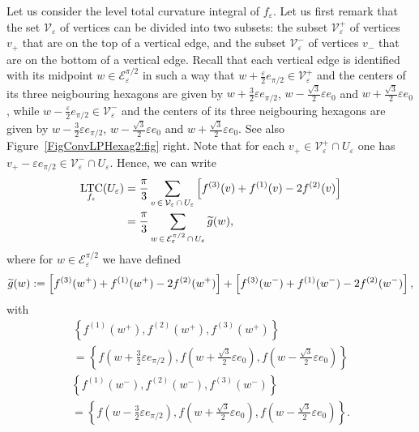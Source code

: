 \documentclass[10pt]{amsart}
\theoremstyle{definition}\newtheorem{defi}[theo]{Definition}\newtheorem{rema}[theo]{Remark}\newtheorem{exam}[theo]{Example}\newtheorem{exem}[theo]{Example}\newtheorem{nota}[theo]{Notation}
\newcommand{\eps}{\varepsilon}
\DeclareMathOperator{\LTC}{LTC}
\newcommand{\calV}{\mathcal{V}}
\newcommand{\calE}{\mathcal{E}}
\let\oldtilde\tilde
\renewcommand*{\tilde}[1]{\mathchoice{\widetilde{#1}}{\widetilde{#1}}{\oldtilde{#1}}{\oldtilde{#1}}}
\begin{document}
Let us consider the level total curvature integral of $f_\eps$. Let us first remark that the set $\calV_\eps$ of vertices can be divided into two subsets: the subset $\calV_\eps^+$ of vertices $v_+$ that are on the top of a vertical edge, and the subset $\calV_\eps^-$ of vertices $v_-$ that are on the bottom of a vertical edge. Recall that each vertical edge is identified with its midpoint $w\in \calE_\eps^{\pi/2}$ in such a way that $w+\frac{\eps}{2} e_{\pi/2}\in\calV_\eps^+$ and the centers of its three neigbouring hexagons are given by $w + \tfrac{3}{2}\eps e_{\pi/2}$, $w - \tfrac{\sqrt{3}}{2}\eps e_{0}$ and $w + \tfrac{\sqrt{3}}{2}\eps e_{0}$, while $w- \tfrac{\eps}{2} e_{\pi/2}\in\calV_\eps^-$ and the centers of its three neigbouring hexagons are given by $w - \frac{3}{2}\eps e_{\pi/2}$, $w - \tfrac{\sqrt{3}}{2}\eps e_{0}$ and $w + \tfrac{\sqrt{3}}{2}\eps e_{0}$. See also Figure~\ref{FigConvLPHexag2:fig} right. Note that for each $v_+\in \calV_\eps^+ \cap U_\eps$ one has $v_+-\eps e_{\pi/2}\in \calV_\eps^- \cap U_\eps$. Hence, we can write
\begin{align*}
\LTC_{f_\eps}(U_\eps)&=\frac{\pi}{3} \sum_{v\,\in\,\calV_\varepsilon\,\cap\,U_\eps} \left[f^{(3)}(v) + f^{(1)}(v)-2 f^{(2)}(v)\right]\\
&= \frac{\pi}{3} \sum_{w\,\in\,\calE_\varepsilon^{\pi/2}\,\cap\,U_\eps} \tilde{g}(w),
\end{align*}
where for $w\in \calE_\varepsilon^{\pi/2}$ we have defined
\[
\tilde{g}(w) := \left[f^{(3)}(w^+) +
f^{(1)}(w^+)-2 f^{(2)}(w^+)\right]+\left[f^{(3)}(w^-) +
f^{(1)}(w^-)-2 f^{(2)}(w^-)\right],
\]
with
\begin{multline*}
\left\{f^{(1)}(w^+), f^{(2)}(w^+),f^{(3)}(w^+)\right\}\\
=\left\{f\left(w+\frac{3}{2}\eps e_{\pi/2}\right), f\left(w+\frac{\sqrt{3}}{2}\eps e_{0}\right),f\left(w-\frac{\sqrt{3}}{2}\eps e_{0}\right)\right\}
\end{multline*}
\begin{multline*}
\left\{f^{(1)}(w^-), f^{(2)}(w^-),f^{(3)}(w^-)\right\}\\
=\left\{f\left(w-\frac{3}{2}\eps e_{\pi/2}\right), f\left(w+\frac{\sqrt{3}}{2}\eps e_{0}\right),f\left(w-\frac{\sqrt{3}}{2}\eps e_{0}\right)\right\}.
\end{multline*}
\end{document}
